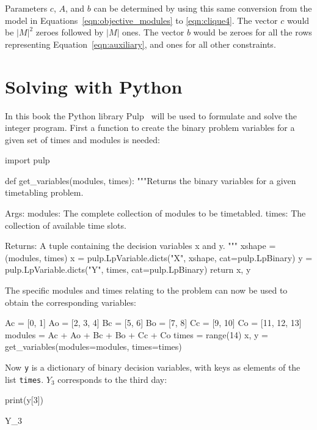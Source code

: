 Parameters \(c\), \(A\), and \(b\) can be determined by using this same conversion
from the model in Equations~\ref{eqn:objective_modules} to \ref{eqn:clique4}.
The vector \(c\) would be \(|M|^2\) zeroes followed by \(|M|\) ones.
The vector \(b\) would be zeroes for all the rows representing
Equation~\ref{eqn:auxiliary}, and ones for all other constraints.

\section{Solving with Python}\label{sec:linear_programming_solving-with-python}

In this book the Python library Pulp~\cite{mitchell2011pulp} will be used to
formulate and solve the integer program. First a function to create the
binary problem variables for a given set of times and modules is needed:

\begin{pyin}
import pulp


def get_variables(modules, times):
    """Returns the binary variables for a given timetabling
    problem.

    Args:
        modules: The complete collection of modules to be
                 timetabled.
        times: The collection of available time slots.

    Returns:
        A tuple containing the decision variables x and y.
    """
    xshape = (modules, times)
    x = pulp.LpVariable.dicts("X", xshape, cat=pulp.LpBinary)
    y = pulp.LpVariable.dicts("Y", times, cat=pulp.LpBinary)
    return x, y
\end{pyin}

The specific modules and times relating to the problem can now be used to
obtain the corresponding variables:

\begin{pyin}
Ac = [0, 1]
Ao = [2, 3, 4]
Bc = [5, 6]
Bo = [7, 8]
Cc = [9, 10]
Co = [11, 12, 13]
modules = Ac + Ao + Bc + Bo + Cc + Co
times = range(14)
x, y = get_variables(modules=modules, times=times)
\end{pyin}

Now \texttt{y} is a dictionary of binary decision variables, with
keys as elements of the list \texttt{times}. \(Y_3\) corresponds to
the third day:

\begin{pyin}
print(y[3])
\end{pyin}

\begin{pyout}
Y_3
\end{pyout}

